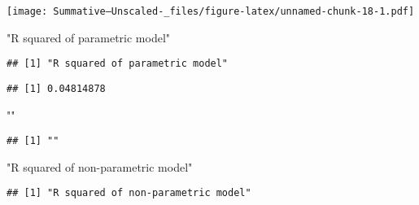\documentclass[
]{article}
\newenvironment{Shaded}{\begin{snugshade}}{\end{snugshade}}
\newcommand{\DecValTok}[1]{\textcolor[rgb]{0.00,0.00,0.81}{#1}}
\newcommand{\FunctionTok}[1]{\textcolor[rgb]{0.00,0.00,0.00}{#1}}
\newcommand{\NormalTok}[1]{#1}
\newcommand{\OtherTok}[1]{\textcolor[rgb]{0.56,0.35,0.01}{#1}}
\newcommand{\SpecialCharTok}[1]{\textcolor[rgb]{0.00,0.00,0.00}{#1}}
\newcommand{\StringTok}[1]{\textcolor[rgb]{0.31,0.60,0.02}{#1}}
\begin{document}
\texttt{[image: Summative--Unscaled-\_files/figure-latex/unnamed-chunk-18-1.pdf]}

\begin{Shaded}
\begin{Highlighting}[]
\StringTok{"R squared of parametric model"}
\end{Highlighting}
\end{Shaded}

\begin{verbatim}
## [1] "R squared of parametric model"
\end{verbatim}

\begin{Shaded}
\end{Shaded}

\begin{verbatim}
## [1] 0.04814878
\end{verbatim}

\begin{Shaded}
\begin{Highlighting}[]
\StringTok{""}
\end{Highlighting}
\end{Shaded}

\begin{verbatim}
## [1] ""
\end{verbatim}

\begin{Shaded}
\begin{Highlighting}[]
\StringTok{"R squared of non{-}parametric model"}
\end{Highlighting}
\end{Shaded}

\begin{verbatim}
## [1] "R squared of non-parametric model"
\end{verbatim}

\begin{Shaded}
\end{Shaded}
\end{document}
